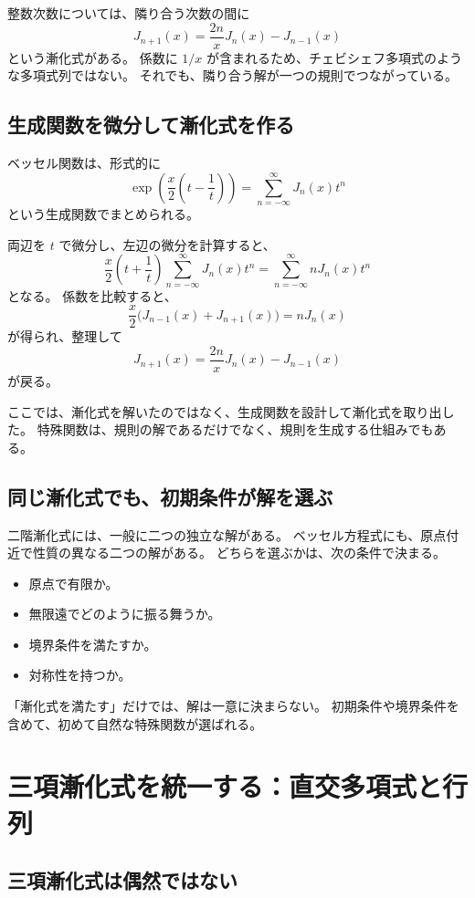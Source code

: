 整数次数については、隣り合う次数の間に
\[
  J_{n+1}(x)
  =\frac{2n}{x}J_n(x)-J_{n-1}(x)
\]
という漸化式がある。
係数に $1/x$ が含まれるため、チェビシェフ多項式のような多項式列ではない。
それでも、隣り合う解が一つの規則でつながっている。

\subsection{生成関数を微分して漸化式を作る}

ベッセル関数は、形式的に
\[
  \exp\left(\frac{x}{2}\left(t-\frac1t\right)\right)
  =\sum_{n=-\infty}^{\infty}J_n(x)t^n
\]
という生成関数でまとめられる。

両辺を $t$ で微分し、左辺の微分を計算すると、
\[
  \frac{x}{2}\left(t+\frac1t\right)
  \sum_{n=-\infty}^{\infty}J_n(x)t^n
  =
  \sum_{n=-\infty}^{\infty}nJ_n(x)t^n
\]
となる。
係数を比較すると、
\[
  \frac{x}{2}\bigl(J_{n-1}(x)+J_{n+1}(x)\bigr)
  =nJ_n(x)
\]
が得られ、整理して
\[
  J_{n+1}(x)=\frac{2n}{x}J_n(x)-J_{n-1}(x)
\]
が戻る。

ここでは、漸化式を解いたのではなく、生成関数を設計して漸化式を取り出した。
特殊関数は、規則の解であるだけでなく、規則を生成する仕組みでもある。

\subsection{同じ漸化式でも、初期条件が解を選ぶ}

二階漸化式には、一般に二つの独立な解がある。
ベッセル方程式にも、原点付近で性質の異なる二つの解がある。
どちらを選ぶかは、次の条件で決まる。

\begin{itemize}
  \item 原点で有限か。
  \item 無限遠でどのように振る舞うか。
  \item 境界条件を満たすか。
  \item 対称性を持つか。
\end{itemize}

「漸化式を満たす」だけでは、解は一意に決まらない。
初期条件や境界条件を含めて、初めて自然な特殊関数が選ばれる。

\section{三項漸化式を統一する：直交多項式と行列}

\subsection{三項漸化式は偶然ではない}

